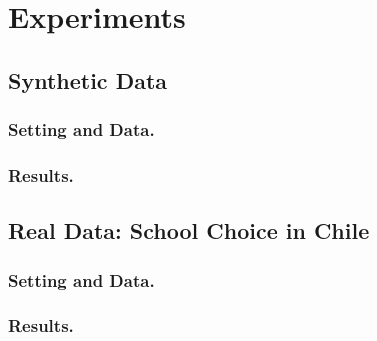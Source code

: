 \section{Experiments} \label{sec: experiments}

  \subsection{Synthetic Data}

      \subsubsection{Setting and Data.}

      \subsubsection{Results.}

  \subsection{Real Data: School Choice in Chile}

      \subsubsection{Setting and Data.}

      \subsubsection{Results.}
